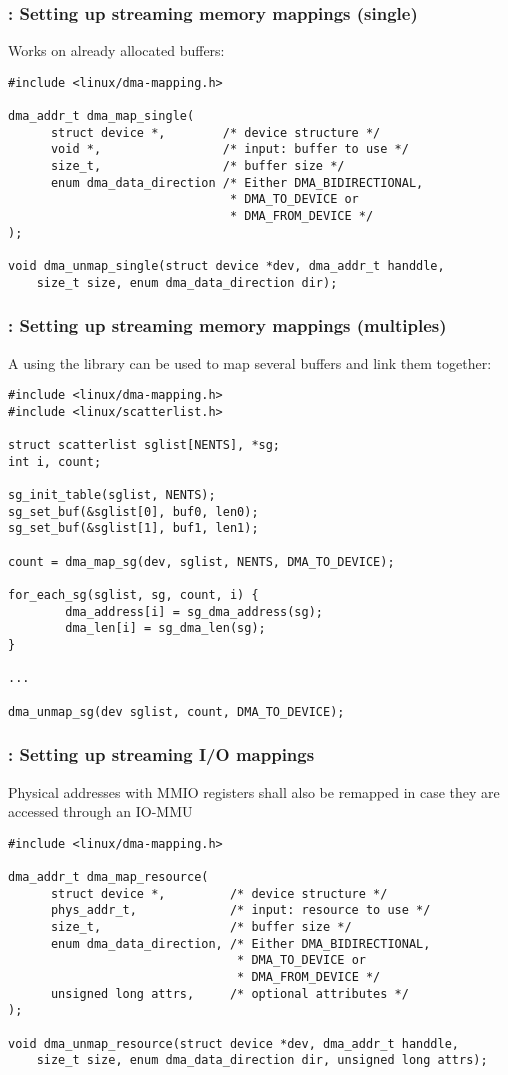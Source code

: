 \begin{frame}[fragile]
  \frametitle{: Setting up streaming memory mappings (single)}
  Works on already allocated buffers:
\begin{verbatim}
#include <linux/dma-mapping.h>

dma_addr_t dma_map_single(
      struct device *,        /* device structure */
      void *,                 /* input: buffer to use */
      size_t,                 /* buffer size */
      enum dma_data_direction /* Either DMA_BIDIRECTIONAL,
                               * DMA_TO_DEVICE or
                               * DMA_FROM_DEVICE */
);

void dma_unmap_single(struct device *dev, dma_addr_t handdle,
    size_t size, enum dma_data_direction dir);
\end{verbatim}
\end{frame}

\begin{frame}[fragile]
  \frametitle{: Setting up streaming memory mappings (multiples)}
  A  using the  library can be
  used to map several buffers and link them together:
\begin{verbatim}
#include <linux/dma-mapping.h>
#include <linux/scatterlist.h>

struct scatterlist sglist[NENTS], *sg;
int i, count;

sg_init_table(sglist, NENTS);
sg_set_buf(&sglist[0], buf0, len0);
sg_set_buf(&sglist[1], buf1, len1);

count = dma_map_sg(dev, sglist, NENTS, DMA_TO_DEVICE);

for_each_sg(sglist, sg, count, i) {
        dma_address[i] = sg_dma_address(sg);
        dma_len[i] = sg_dma_len(sg);
}

...

dma_unmap_sg(dev sglist, count, DMA_TO_DEVICE);
\end{verbatim}
\end{frame}

\begin{frame}[fragile]
  \frametitle{: Setting up streaming I/O mappings}
  Physical addresses with MMIO registers shall also be remapped in case
  they are accessed through an IO-MMU
\begin{verbatim}
#include <linux/dma-mapping.h>

dma_addr_t dma_map_resource(
      struct device *,         /* device structure */
      phys_addr_t,             /* input: resource to use */
      size_t,                  /* buffer size */
      enum dma_data_direction, /* Either DMA_BIDIRECTIONAL,
                                * DMA_TO_DEVICE or
                                * DMA_FROM_DEVICE */
      unsigned long attrs,     /* optional attributes */
);

void dma_unmap_resource(struct device *dev, dma_addr_t handdle,
    size_t size, enum dma_data_direction dir, unsigned long attrs);
\end{verbatim}
\end{frame}

